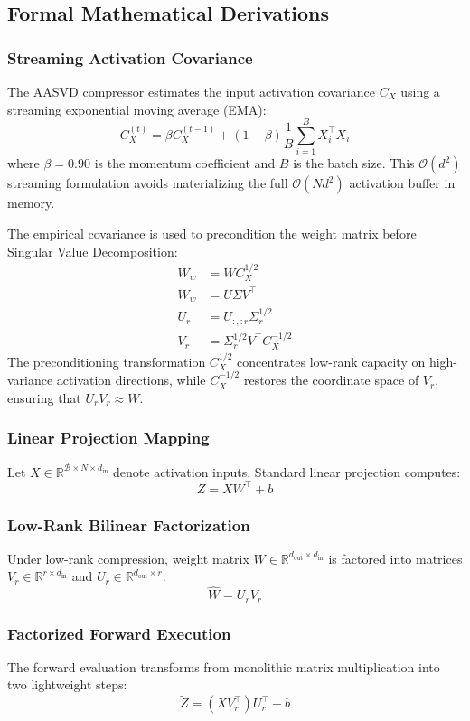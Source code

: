 \subsection{Formal Mathematical Derivations}

\subsubsection{Streaming Activation Covariance}
\label{sec:activation_covariance}
The AASVD compressor estimates the input activation covariance $C_X$ using a streaming exponential moving average (EMA):
\[
C_X^{(t)} = \beta C_X^{(t-1)} + (1 - \beta) \frac{1}{B} \sum_{i=1}^B X_i^\top X_i
\]
where $\beta = 0.90$ is the momentum coefficient and $B$ is the batch size. This $\mathcal{O}(d^2)$ streaming formulation avoids materializing the full $\mathcal{O}(N d^2)$ activation buffer in memory.

The empirical covariance is used to precondition the weight matrix before Singular Value Decomposition:
\begin{align}
W_w &= W C_X^{1/2} \\
W_w &= U \Sigma V^\top \\
U_r &= U_{:, :r} \Sigma_r^{1/2} \\
V_r &= \Sigma_r^{1/2} V^\top C_X^{-1/2}
\end{align}
The preconditioning transformation $C_X^{1/2}$ concentrates low-rank capacity on high-variance activation directions, while $C_X^{-1/2}$ restores the coordinate space of $V_r$, ensuring that $U_r V_r \approx W$.

\subsubsection{Linear Projection Mapping}
Let $X \in \mathbb{R}^{\mathcal{B} \times N \times d_{\text{in}}}$ denote activation inputs. Standard linear projection computes:
\[
Z = X W^\top + b
\]

\subsubsection{Low-Rank Bilinear Factorization}
Under low-rank compression, weight matrix $W \in \mathbb{R}^{d_{\text{out}} \times d_{\text{in}}}$ is factored into matrices $V_r \in \mathbb{R}^{r \times d_{\text{in}}}$ and $U_r \in \mathbb{R}^{d_{\text{out}} \times r}$:
\[
\hat{W} = U_r V_r
\]

\subsubsection{Factorized Forward Execution}
The forward evaluation transforms from monolithic matrix multiplication into two lightweight steps:
\[
\tilde{Z} = (X V_r^\top) U_r^\top + b
\]

